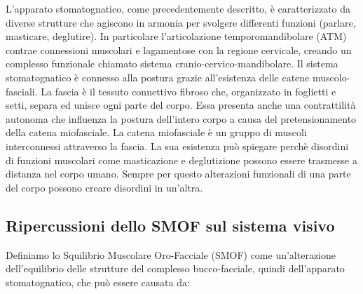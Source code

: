 L’apparato stomatognatico, come precedentemente descritto, è caratterizzato da diverse strutture che agiscono in armonia per svolgere differenti funzioni (parlare, masticare, deglutire). In particolare l’articolazione temporomandibolare (ATM) contrae connessioni muscolari e lagamentose con la regione cervicale, creando un complesso funzionale chiamato sistema cranio-cervico-mandibolare. Il sistema stomatognatico è connesso alla postura grazie all’esistenza delle catene muscolo-fasciali. La fascia è il tessuto connettivo fibroso che, organizzato in foglietti e setti, separa ed unisce ogni parte del corpo. Essa presenta anche una contrattilità autonoma che influenza la postura dell’intero corpo a causa del pretensionamento della catena miofasciale. La catena miofasciale è un gruppo di muscoli interconnessi attraverso la fascia. La sua esistenza può spiegare perchè disordini di funzioni muscolari come masticazione e deglutizione possono essere trasmesse a distanza nel corpo umano. Sempre per questo alterazioni funzionali di una parte del corpo possono creare disordini in un’altra.
 
 
 
\subsection{Ripercussioni dello SMOF sul sistema visivo}
 
Definiamo lo Squilibrio Muscolare Oro-Facciale (SMOF) come un’alterazione dell’equilibrio delle strutture del complesso bucco-facciale, quindi dell’apparato stomatognatico, che può essere causata da:

